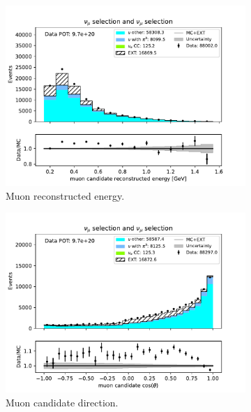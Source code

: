 \begin{figure}[H]
    \centering
    \begin{subfigure}{0.33\linewidth}
        \includegraphics[width=\linewidth]{technote/Sidebands/Figures/NuMuSideband/muon_sideband_muon_energy_run1234b4c4d_NUMU_NUMU.pdf}
        \caption{Muon reconstructed energy.}
    \end{subfigure}%
    \begin{subfigure}{0.33\linewidth}
        \includegraphics[width=\linewidth]{technote/Sidebands/Figures/NuMuSideband/muon_sideband_muon_theta_run1234b4c4d_NUMU_NUMU.pdf}
        \caption{Muon candidate direction.}
    \end{subfigure}%
    \begin{subfigure}{0.33\linewidth}

\end{subfigure}
\end{figure}
